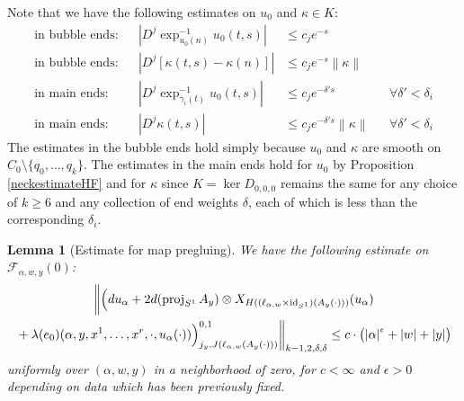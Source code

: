 \documentclass[12pt]{article}
\newtheorem{lemma}[theorem]{Lemma}
\theoremstyle{definition}
\theoremstyle{remark}
\numberwithin{equation}{subsection}
\newcommand{\F}{\mathcal F}
\newcommand{\proj}{\operatorname{proj}}
\newcommand{\id}{\operatorname{id}}
\begin{document}
Note that we have the following estimates on $u_0$ and $\kappa\in K$:
\begin{align}
\label{uzerobubble}\text{in bubble ends:}&&\left|D^j\exp_{u_0(n)}^{-1}u_0(t,s)\right|&\leq c_je^{-s}\\
\label{kappabubble}\text{in bubble ends:}&&\left|D^j[\kappa(t,s)-\kappa(n)]\right|&\leq c_je^{-s}\left\|\kappa\right\|\\
\label{uzeromain}\text{in main ends:}&&\left|D^j\exp_{\gamma_i(t)}^{-1}u_0(t,s)\right|&\leq c_je^{-\delta's}&&\forall\delta'<\delta_i\\
\label{kappamain}\text{in main ends:}&&\left|D^j\kappa(t,s)\right|&\leq c_je^{-\delta's}\left\|\kappa\right\|&&\forall\delta'<\delta_i
\end{align}
The estimates in the bubble ends hold simply because $u_0$ and $\kappa$ are smooth on $C_0\setminus\{q_0,\ldots,q_k\}$.  The estimates in the main ends hold for $u_0$ by Proposition \ref{neckestimateHF} and for $\kappa$ since $K=\ker D_{0,0,0}$ remains the same for any choice of $k\geq 6$ and any collection of end weights $\delta$, each of which is less than the corresponding $\delta_i$.

\begin{lemma}[Estimate for map pregluing]\label{mappregluingissmallHF}
We have the following estimate on $\F_{\alpha,w,y}(0)$:
\begin{multline}\label{mappregluingdelbar}
\biggl\|\Bigl(du_\alpha+2d(\proj_{S^1}A_y)\otimes X_{H((\ell_{\alpha,w}\times\id_{S^1})(A_y(\cdot)))}(u_\alpha)\\
{}+\lambda(e_0)(\alpha,y,x^1,\ldots,x^r,\cdot,u_\alpha(\cdot))\Bigr)^{0,1}_{j_y,J(\ell_{\alpha,w}(A_y(\cdot)))}\biggr\|_{k-1,2,\delta,\delta}
\leq c\cdot\bigl(\left|\alpha\right|^\epsilon+\left|w\right|+\left|y\right|\bigr)
\end{multline}
uniformly over $(\alpha,w,y)$ in a neighborhood of zero, for $c<\infty$ and $\epsilon>0$ depending on data which has been previously fixed.
\end{lemma}
\end{document}
